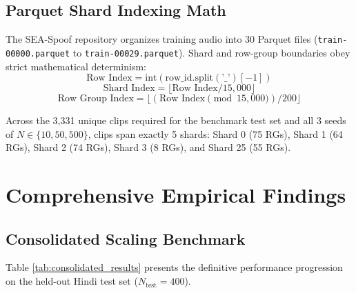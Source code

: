 \documentclass[11pt,a4paper]{article}
\begin{document}
\subsection{Parquet Shard Indexing Math}
The SEA-Spoof repository organizes training audio into 30 Parquet files (\texttt{train-00000.parquet} to \texttt{train-00029.parquet}). Shard and row-group boundaries obey strict mathematical determinism:
\begin{equation}
\text{Row Index} = \text{int}(\text{row\_id}.\text{split}(\text{'\_'})[-1])
\end{equation}
\begin{equation}
\text{Shard Index} = \lfloor \text{Row Index} / 15,000 \rfloor
\end{equation}
\begin{equation}
\text{Row Group Index} = \lfloor (\text{Row Index} \pmod{15,000}) / 200 \rfloor
\end{equation}

Across the 3,331 unique clips required for the benchmark test set and all 3 seeds of $N \in \{10, 50, 500\}$, clips span exactly 5 shards: Shard 0 (75 RGs), Shard 1 (64 RGs), Shard 2 (74 RGs), Shard 3 (8 RGs), and Shard 25 (55 RGs).

\section{Comprehensive Empirical Findings}

\subsection{Consolidated Scaling Benchmark}
Table \ref{tab:consolidated_results} presents the definitive performance progression on the held-out Hindi test set ($N_{\text{test}} = 400$).

\begin{table}[h!]
\centering
\small
\caption{Consolidated Evaluation Metrics on Held-Out Hindi Test Set ($N_{\text{test}} = 400$, 50/50 Balanced)}
\label{tab:consolidated_results}
\end{table}
\end{document}
